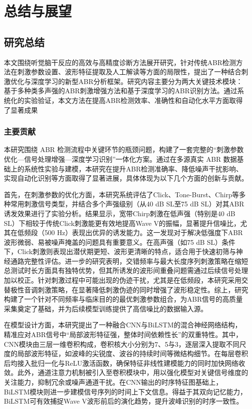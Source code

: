\chapter{总结与展望}
\section{研究总结}
本文围绕听觉脑干反应的高效与高精度诊断方法展开研究，针对传统ABR检测方法在刺激参数设置、波形特征提取及人工解读等方面的局限性，提出了一种结合刺激优化与深度学习的新型ABR分析框架。研究内容主要分为两大关键技术模块：基于多种类多声强的ABR刺激增强方法和基于深度学习的ABR识别方法。通过系统化的实验验证，本文方法在提高ABR检测效率、准确性和自动化水平方面取得了显著成果
\subsection*{主要贡献}

本研究围绕 ABR 检测流程中关键环节的瓶颈问题，构建了一套完整的“刺激参数优化—信号处理增强—深度学习识别”一体化方案。通过在多源真实 ABR 数据基础上的系统性实验与建模，本研究在提升ABR检测准确率、降低噪声干扰影响、实现自动化识别等方面取得了显著进展，具体体现为以下几个方面的创新与贡献。

首先，在刺激参数的优化方面，本研究系统评估了Click、Tone-Burst、Chirp等多种常用刺激信号类型，并结合多个声强级别（从40 dB SL至75 dB SL）对其ABR诱发效果进行了实验分析。结果显示，宽带Chirp刺激在低声强（特别是40 dB SL）下相较于传统Click刺激能更有效地提高Wave V的振幅，显著提升信噪比，尤其在低频段（500 Hz）表现出优异的诱发能力。这一发现对于解决低强度下ABR波形微弱、易被噪声掩盖的问题具有重要意义。在高声强（如75 dB SL）条件下，Click刺激则表现出潜伏期更短、波形更清晰的特点，适合用于快速初筛与神经通路完整性评估。进一步的研究表明，交错频率与最大长度序列刺激策略在缩短总测试时长方面具有独特优势，但其所诱发的波形间重叠问题需通过后续信号处理加以校正。针对刺激过程中可能出现的伪迹干扰，尤其是在低频段，本研究采用交替极性音调刺激策略，在显著降低刺激伪迹的同时增强了波形稳定性。综上，研究构建了一个针对不同频率与临床目的的最优刺激参数组合，为ABR信号的高质量采集奠定了基础，并为后续模型训练提供了高信噪比的数据输入源。

在模型设计方面，本研究提出了一种融合CNN与BiLSTM的混合神经网络结构，精准应对ABR信号中“局部波形特征强，整体时间依赖性长”的双重特性。其中，CNN模块由三层一维卷积构成，卷积核大小分别为7、5与3，逐层深入提取不同尺度的局部波形特征，如波峰的尖锐度、波谷的持续时间等微结构细节。在每层卷积后均接入批归一化与ReLU激活函数，确保特征非线性建模能力的同时加快网络收敛。此外，通道注意力机制被引入至卷积模块中，用以强化模型对关键信号维度的关注能力，抑制冗余或噪声通道干扰。在CNN输出的时序特征图基础上，BiLSTM模块则进一步建模信号序列的时间上下文信息。得益于其双向记忆能力，BiLSTM可有效捕捉Wave V波形前后的演化趋势，提升波峰识别的时序一致性。

